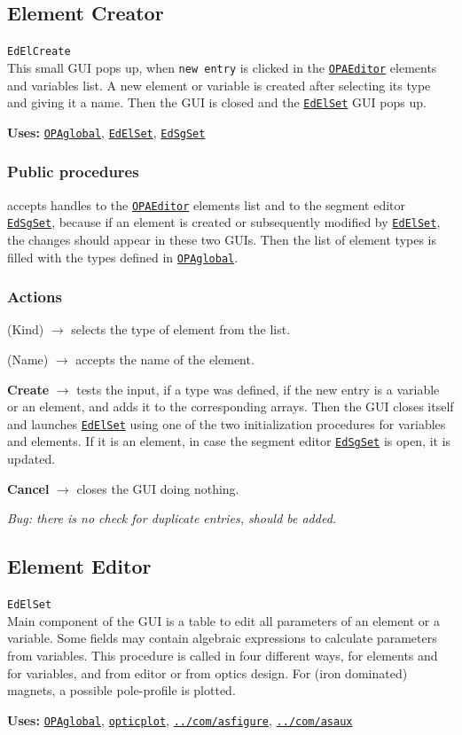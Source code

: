 \documentclass[12pt]{article}
\newcommand\code[1]{{\tt #1}}
\newcommand{\ofld}[1]{\colorbox{black!15}{{\bf #1}}}
\newcommand{\ofldx}[1]{\colorbox{black!15}{(#1)}}
\newcommand\guico[1]{{\color{blue}\code{#1}}}
\newcommand{\evcod}[2]{\ofld{#1} $\rightarrow$ \guico{#2}}
\newcommand{\evcodx}[2]{\ofldx{#1} $\rightarrow$ \guico{#2}}
\newcommand{\opagui}[1]{\colorbox{blue!20}{\code{#1}}}
\newcommand{\oguih}[2]{\subsection{\label{#2}#1}{\Huge\opagui{#2}}\\}
\newcommand{\ogui}[1]{\hyperref[#1]{\opagui{#1}}}
\newcommand{\opaguif}[1]{\colorbox{violet!30}{\code{#1}}}
\newcommand{\oguif}[1]{\hyperref[#1]{\opaguif{#1}}}
\newcommand{\opauni}[1]{\colorbox{orange!30}{\code{#1}}}
\newcommand{\ouni}[1]{\hyperref[#1]{\opauni{#1}}}
\newcommand{\uses}[1]{{\bf Uses: } #1}
\newcommand{\desc}[1]{#1}
\newcommand{\act}[1]{\subsubsection*{Actions} #1}
\newcommand{\ppro}[1]{\subsubsection*{Public procedures} #1}
\newcommand{\todo}[1]{{\color{red}\em #1}}
\begin{document}
\oguih{Element Creator}{EdElCreate} 

\desc{This small GUI pops up, when \code{new entry} is clicked in the \ouni{OPAEditor} elements and variables list. A new element or variable is created after selecting its type and giving it a name. Then the GUI is closed and the \ogui{EdElSet} GUI pops up.}

\uses{\ouni{OPAglobal}, \ogui{EdElSet}, \ogui{EdSgSet} }   
\ppro{
\guico{Init} accepts handles to the \ogui{OPAEditor} elements list and to the segment editor \ouni{EdSgSet}, because if an element is created or subsequently modified by \ogui{EdElSet}, the changes should appear in these two GUIs. Then the list of element types is filled with the types defined in \ouni{OPAglobal}.
}

\act{
\evcodx{Kind}{ComETypeChange} selects the type of element from the list.

\evcodx{Name}{EdENameChange} accepts the name of the element.

\evcod{Create}{ButCreClick} tests the input, if a type was defined, if the new entry is a variable or an element, and adds it to the corresponding arrays. Then the GUI closes itself and launches \ogui{EdElSet} using one of the two initialization procedures for variables and elements. If it is an element, in case  the segment editor \ogui{EdSgSet} is open, it is updated.

\evcod{Cancel}{ButCanClick} closes the GUI doing nothing.
}

\todo{Bug: there is no check for duplicate entries, should be added.}


\oguih{Element Editor}{EdElSet} 

\desc{
Main component of the GUI is a table to edit all parameters of an element or a variable. Some fields may contain algebraic expressions to calculate parameters from variables. This procedure is called in four different ways, for elements and for variables, and from editor or from optics design. For (iron dominated) magnets, a possible pole-profile is plotted.
}

\uses{\ouni{OPAglobal}, \ouni{opticplot}, \oguif{../com/asfigure}, \ouni{../com/asaux}}
\end{document}
